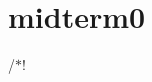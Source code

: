 \chapter{midterm0 }
\hypertarget{md__midterm_01_reviews_2_midterm_010_2midterm0}{}\label{md__midterm_01_reviews_2_midterm_010_2midterm0}
/\texorpdfstring{$\ast$}{*}! 